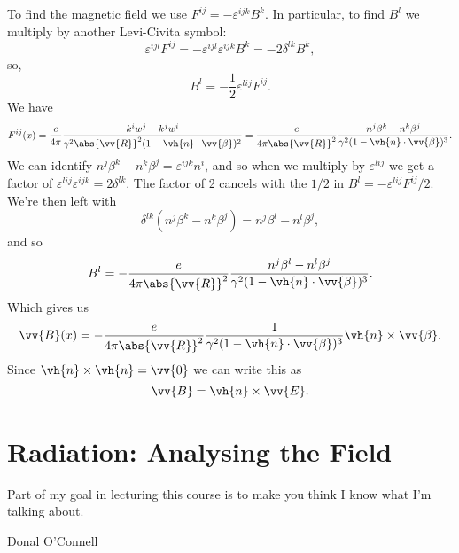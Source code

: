 \documentclass[fleqn]{NotesClass}
\begin{document}
    To find the magnetic field we use \(F^{ij} = -\varepsilon^{ijk}B^k\).
    In particular, to find \(B^l\) we multiply by another Levi-Civita symbol:
    \begin{equation}
        \varepsilon^{ijl} F^{ij} = -\varepsilon^{ijl}\varepsilon^{ijk}B^k = -2\delta^{lk}B^k,
    \end{equation}
    so,
    \begin{equation}
        B^l = -\frac{1}{2} \varepsilon^{lij} F^{ij}.
    \end{equation}
    We have
    \begin{equation}
        F^{ij}(x) = \frac{e}{4\pi} \frac{k^iw^j - k^jw^i}{\gamma^2 \abs{\vv{R}}^2(1 - \vh{n}\cdot\vv{\beta})^2} = \frac{e}{4\pi\abs{\vv{R}}^2} \frac{n^j\beta^k - n^k \beta^j}{\gamma^2(1 - \vh{n}\cdot\vv{\beta})^3}.
    \end{equation}
    We can identify \(n^j \beta^k - n^k \beta^j = \varepsilon^{ijk}n^i\), and so when we multiply by \(\varepsilon^{lij}\) we get a factor of \(\varepsilon^{lij}\varepsilon^{ijk} = 2\delta^{lk}\).
    The factor of 2 cancels with the \(1/2\) in \(B^l = -\varepsilon^{lij}F^{ij}/2\).
    We're then left with
    \begin{equation}
        \delta^{lk}(n^j \beta^k - n^k \beta^j) = n^j \beta^l - n^l \beta^j,
    \end{equation}
    and so
    \begin{equation}
        B^l = - \frac{e}{4\pi\abs{\vv{R}}^2} \frac{n^j \beta^l - n^l \beta^j}{\gamma^2(1 - \vh{n}\cdot \vv{\beta})^3}.
    \end{equation}
    Which gives us
    \begin{equation}
        \vv{B}(x) = -\frac{e}{4\pi\abs{\vv{R}}^2} \frac{1}{\gamma^2(1 - \vh{n}\cdot\vv{\beta})^3} \vh{n} \times \vv{\beta}.
    \end{equation}
    Since \(\vh{n} \times \vh{n} = \vv{0}\) we can write this as
    \begin{equation}
        \vv{B} = \vh{n} \times \vv{E}.
    \end{equation}
    
    \chapter{Radiation: Analysing the Field}
    \epigraph{Part of my goal in lecturing this course is to make you think I know what I'm talking about.}{Donal O'Connell}
    
\end{document}
